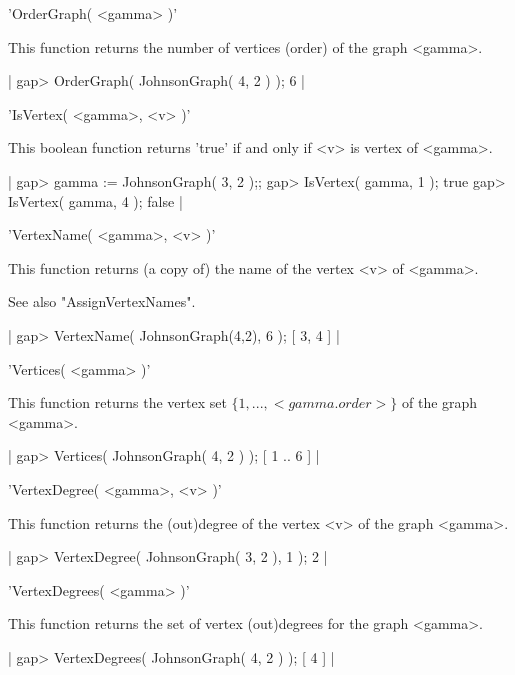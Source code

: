 
'OrderGraph( <gamma> )'

This  function returns  the  number  of  vertices  (order)  of the  graph
<gamma>.

|    gap> OrderGraph( JohnsonGraph( 4, 2 ) );
    6 |


'IsVertex( <gamma>, <v> )'

This  boolean  function returns 'true' if  and  only if  <v> is vertex of
<gamma>.

|    gap> gamma := JohnsonGraph( 3, 2 );;
    gap> IsVertex( gamma, 1 );
    true
    gap> IsVertex( gamma, 4 );
    false |


'VertexName( <gamma>, <v> )'

This function returns (a copy of) the name of the vertex <v> of <gamma>.

See also "AssignVertexNames".

|    gap> VertexName( JohnsonGraph(4,2), 6 );
    [ 3, 4 ] |


'Vertices( <gamma> )'

This  function returns  the  vertex  set $\{1,...,<gamma.order>\}$ of the
graph <gamma>.

|    gap> Vertices( JohnsonGraph( 4, 2 ) );
    [ 1 .. 6 ] |


'VertexDegree( <gamma>, <v> )'

This  function  returns the  (out)degree  of the vertex <v> of  the graph
<gamma>.

|    gap> VertexDegree( JohnsonGraph( 3, 2 ), 1 );
    2 |


'VertexDegrees( <gamma> )'

This function returns the set of vertex (out)degrees for the graph
<gamma>.

|    gap> VertexDegrees( JohnsonGraph( 4, 2 ) );
    [ 4 ] |


